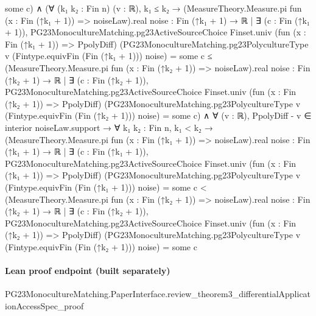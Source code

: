\documentclass[10pt]{article}
\begin{document}
\begin{ReviewVerbatim}
{                some c}) ∧
    (∀ (k₁ k₂ : Fin n) (v : ℝ),
        k₁ ≤ k₂ →
          (MeasureTheory.Measure.pi fun (x : Fin (↑k₁ + 1)) => noiseLaw).real
              {noise : Fin (↑k₁ + 1) → ℝ |
                ∃ (c : Fin (↑k₁ + 1)),
                  PG23MonocultureMatching.pg23ActiveSourceChoice Finset.univ (fun (x : Fin (↑k₁ + 1)) => PpolyDiff)
                      (PG23MonocultureMatching.pg23PolycultureType v (Fintype.equivFin (Fin (↑k₁ + 1))) noise) =
                    some c} ≤
            (MeasureTheory.Measure.pi fun (x : Fin (↑k₂ + 1)) => noiseLaw).real
              {noise : Fin (↑k₂ + 1) → ℝ |
                ∃ (c : Fin (↑k₂ + 1)),
                  PG23MonocultureMatching.pg23ActiveSourceChoice Finset.univ (fun (x : Fin (↑k₂ + 1)) => PpolyDiff)
                      (PG23MonocultureMatching.pg23PolycultureType v (Fintype.equivFin (Fin (↑k₂ + 1))) noise) =
                    some c}) ∧
      ∀ (v : ℝ),
        PpolyDiff - v ∈ interior noiseLaw.support →
          ∀ {k₁ k₂ : Fin n},
            k₁ < k₂ →
              (MeasureTheory.Measure.pi fun (x : Fin (↑k₁ + 1)) => noiseLaw).real
                  {noise : Fin (↑k₁ + 1) → ℝ |
                    ∃ (c : Fin (↑k₁ + 1)),
                      PG23MonocultureMatching.pg23ActiveSourceChoice Finset.univ (fun (x : Fin (↑k₁ + 1)) => PpolyDiff)
                          (PG23MonocultureMatching.pg23PolycultureType v (Fintype.equivFin (Fin (↑k₁ + 1))) noise) =
                        some c} <
                (MeasureTheory.Measure.pi fun (x : Fin (↑k₂ + 1)) => noiseLaw).real
                  {noise : Fin (↑k₂ + 1) → ℝ |
                    ∃ (c : Fin (↑k₂ + 1)),
                      PG23MonocultureMatching.pg23ActiveSourceChoice Finset.univ (fun (x : Fin (↑k₂ + 1)) => PpolyDiff)
                          (PG23MonocultureMatching.pg23PolycultureType v (Fintype.equivFin (Fin (↑k₂ + 1))) noise) =
                        some c}
\end{ReviewVerbatim}

\paragraph{Lean proof endpoint (built separately)}\begin{ReviewVerbatim}
PG23MonocultureMatching.PaperInterface.review_theorem3_differentialApplicationAccessSpec_proof
\end{ReviewVerbatim}
\end{document}
